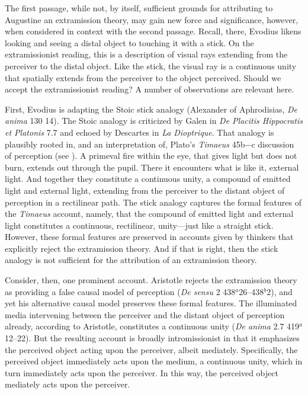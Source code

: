 \documentclass[12pt]{article}
\begin{document}
The first passage, while not, by itself, sufficient grounds for attributing to Augustine an extramission theory, may gain new force and significance, however, when considered in context with the second passage. Recall, there, Evodius likens looking and seeing a distal object to touching it with a stick. On the extramissionist reading, this is a description of visual rays extending from the perceiver to the distal object. Like the stick, the visual ray is a continuous unity that spatially extends from the perceiver to the object perceived. Should we accept the extramissionist reading? A number of observations are relevant here.

First, Evodius is adapting the Stoic stick analogy (Alexander of Aphrodisias, \emph{De anima} 130 14).  The Stoic analogy is criticized by Galen in \emph{De Placitis Hippocratis et Platonis} 7.7 and echoed by Descartes in \emph{La Dioptrique}. That analogy is plausibly rooted in, and an interpretation of, Plato's \emph{Timaeus} 45b−c discussion of perception (see \citealt[chapter one]{Lindberg:1977aa}). A primeval fire within the eye, that gives light but does not burn, extends out through the pupil. There it encounters what is like it, external light. And together they constitute a continuous unity, a compound of emitted light and external light, extending from the perceiver to the distant object of perception in a rectilinear path. The stick analogy captures the formal features of the \emph{Timaeus} account, namely, that the compound of emitted light and external light constitutes a continuous, rectilinear, unity---just like a straight stick. However, these formal features are preserved in accounts given by thinkers that explicitly reject the extramission theory. And if that is right, then the stick analogy is not sufficient for the attribution of an extramission theory.

Consider, then, one prominent account. Aristotle rejects the extramission theory as providing a false causal model of perception (\emph{De sensu} 2 438\( ^{a} \)26--438\( ^{b} \)2), and yet his alternative causal model preserves these formal features. The illuminated media intervening between the perceiver and the distant object of perception already, according to Aristotle, constitutes a continuous unity (\emph{De anima} 2.7 419\( ^{a} \)12--22). But the resulting account is broadly intromissionist in that it emphasizes the perceived object acting upon the perceiver, albeit mediately. Specifically, the perceived object immediately acts upon the medium, a continuous unity, which in turn immediately acts upon the perceiver. In this way, the perceived object mediately acts upon the perceiver.
\end{document}
